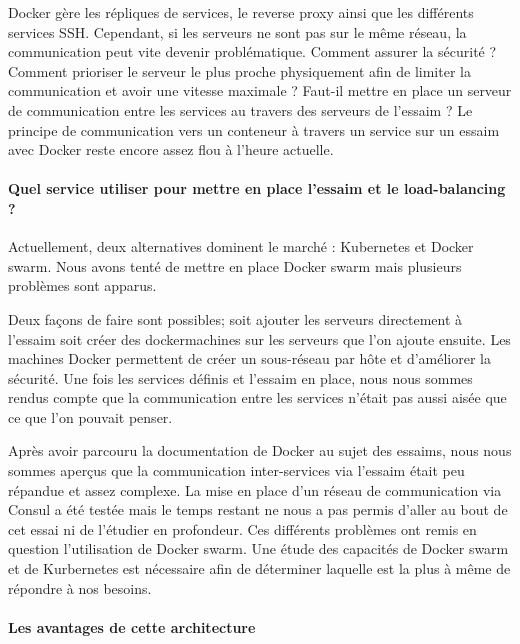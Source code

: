 \par Docker gère les répliques de services, le reverse proxy ainsi que les différents services SSH. Cependant, si les serveurs ne sont pas sur le même réseau, la communication peut vite devenir problématique. Comment assurer la sécurité ? Comment prioriser le serveur le plus proche physiquement afin de limiter la communication et avoir une vitesse maximale ? Faut-il mettre en place un serveur de communication entre les services au travers des serveurs de l’essaim ? Le principe de communication vers un conteneur à travers un service sur un essaim avec Docker reste encore assez flou à l’heure actuelle. 

\paragraph{Quel service utiliser pour mettre en place l’essaim et le load-balancing ?}

\par Actuellement, deux alternatives dominent le marché : Kubernetes et Docker swarm. Nous avons tenté de mettre en place Docker swarm mais plusieurs problèmes sont apparus. \\

\par Deux façons de faire sont possibles; soit ajouter les serveurs directement à l’essaim soit créer des \gls{dockermachine}s sur les serveurs que l’on ajoute ensuite. Les machines Docker permettent de créer un sous-réseau par hôte et d’améliorer la sécurité. Une fois les services définis et l’essaim en place, nous nous sommes rendus compte que la communication entre les services n’était pas aussi aisée que ce que l’on pouvait penser. 

\par Après avoir parcouru la documentation de Docker au sujet des essaims, nous nous sommes aperçus que la communication inter-services via l’\gls{essaim} était peu répandue et assez complexe. La mise en place d’un réseau de communication via Consul a été testée mais le temps restant ne nous a pas permis d’aller au bout de cet essai ni de l’étudier en profondeur. Ces différents problèmes ont remis en question l’utilisation de Docker swarm. Une étude des capacités de Docker swarm et de Kurbernetes est nécessaire afin de déterminer laquelle est la plus à même de répondre à nos besoins.

\paragraph{Les avantages de cette architecture}

